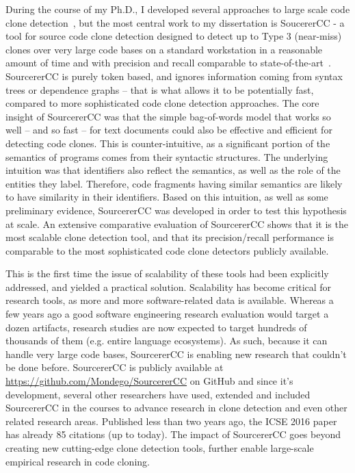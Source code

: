 \documentclass[a4paper]{article}
\begin{document}
During the course of my Ph.D., I developed several approaches to large scale code clone detection~\cite{parallellCCW, parallellCCJ, parallellCCC}, but the most central work to my dissertation is SoucererCC  -  a tool for source code clone detection designed to detect up to Type 3 (near-miss) clones over very large code bases on a standard workstation in a reasonable amount of time and with precision and recall comparable to state-of-the-art~\cite{sourcererCC}. SourcererCC is purely token based, and ignores information coming from syntax trees or dependence graphs – that is what allows it to be potentially fast, compared to more sophisticated code clone detection approaches. %
The core insight of SourcererCC was that the simple bag-of-words model that works so well – and so fast – for text documents could also be effective and efficient for detecting code clones. This is counter-intuitive, as a significant portion of the semantics of programs comes from their syntactic structures. The underlying intuition was that identifiers also reflect the semantics, as well as the role of the entities they label. Therefore, code fragments having similar semantics are likely to have similarity in their identifiers. Based on this intuition, as well as some preliminary evidence, SourcererCC was developed in order to test this hypothesis at scale. An extensive comparative evaluation of SourcererCC shows that it is the most scalable clone detection tool, and that its precision/recall performance is comparable to the most sophisticated code clone detectors publicly available.

This is the first time the issue of scalability of these tools had been explicitly addressed, and yielded a practical solution. Scalability has become critical for research tools, as more and more software-related data is available. Whereas a few years ago a good software engineering research evaluation would target a dozen artifacts, research studies are now expected to target hundreds of thousands of them (e.g. entire language ecosystems). As such, because it can handle very large code bases, SourcererCC is enabling new research that couldn’t be done before. SourcererCC is publicly available at \url{https://github.com/Mondego/SourcererCC} on GitHub and since it's development, several other researchers have used, extended and included  SourcererCC in the courses to advance research in clone detection and even other related research areas. Published less than two years ago, the ICSE 2016 paper has already 85 citations (up to today).
The impact of SourcererCC goes beyond creating new cutting-edge clone detection tools, further enable large-scale empirical research in code cloning. 
\end{document}
